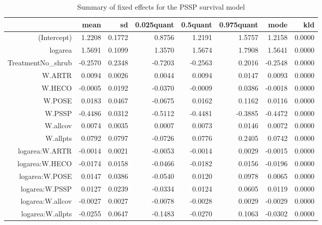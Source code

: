\begin{table}[ht]
\centering
\caption{Summary of fixed effects for the PSSP survival model} 
\label{PSSPsurvival}
\begin{tabular}{rrrrrrrr}
  \hline
 & mean & sd & 0.025quant & 0.5quant & 0.975quant & mode & kld \\ 
  \hline
(Intercept) & 1.2208 & 0.1772 & 0.8756 & 1.2191 & 1.5757 & 1.2158 & 0.0000 \\ 
  logarea & 1.5691 & 0.1099 & 1.3570 & 1.5674 & 1.7908 & 1.5641 & 0.0000 \\ 
  TreatmentNo\_shrub & -0.2570 & 0.2348 & -0.7203 & -0.2563 & 0.2016 & -0.2548 & 0.0000 \\ 
  W.ARTR & 0.0094 & 0.0026 & 0.0044 & 0.0094 & 0.0147 & 0.0093 & 0.0000 \\ 
  W.HECO & -0.0005 & 0.0192 & -0.0370 & -0.0009 & 0.0386 & -0.0018 & 0.0000 \\ 
  W.POSE & 0.0183 & 0.0467 & -0.0675 & 0.0162 & 0.1162 & 0.0116 & 0.0000 \\ 
  W.PSSP & -0.4486 & 0.0312 & -0.5112 & -0.4481 & -0.3885 & -0.4472 & 0.0000 \\ 
  W.allcov & 0.0074 & 0.0035 & 0.0007 & 0.0073 & 0.0146 & 0.0072 & 0.0000 \\ 
  W.allpts & 0.0792 & 0.0797 & -0.0726 & 0.0776 & 0.2405 & 0.0742 & 0.0000 \\ 
  logarea:W.ARTR & -0.0014 & 0.0021 & -0.0053 & -0.0014 & 0.0029 & -0.0015 & 0.0000 \\ 
  logarea:W.HECO & -0.0174 & 0.0158 & -0.0466 & -0.0182 & 0.0156 & -0.0196 & 0.0000 \\ 
  logarea:W.POSE & 0.0147 & 0.0386 & -0.0540 & 0.0120 & 0.0978 & 0.0065 & 0.0000 \\ 
  logarea:W.PSSP & 0.0127 & 0.0239 & -0.0334 & 0.0124 & 0.0605 & 0.0119 & 0.0000 \\ 
  logarea:W.allcov & -0.0027 & 0.0027 & -0.0078 & -0.0028 & 0.0029 & -0.0029 & 0.0000 \\ 
  logarea:W.allpts & -0.0255 & 0.0647 & -0.1483 & -0.0270 & 0.1063 & -0.0302 & 0.0000 \\ 
   \hline
\end{tabular}
\end{table}


